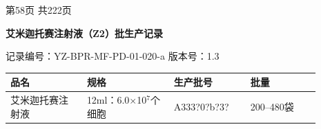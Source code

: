 \documentclass[UTF8,10pt,a4paper,fontset=fandol]{ctexart}
\newcommand{\fieldvalue}[1]{#1}
\newcommand{\handwritten}[1]{#1}
\begin{document}
\vfill
\begin{center}
第58页 共222页
\end{center}

\newpage

\begin{center}
\textbf{艾米迦托赛注射液（Z2）批生产记录}

记录编号：YZ-BPR-MF-PD-01-020-a \hspace{1em} 版本号：1.3
\end{center}

\begin{tabular}{|p{0.22\linewidth}|p{0.25\linewidth}|p{0.22\linewidth}|p{0.20\linewidth}|}
\hline
品名 & 规格 & 生产批号 & 批量 \\ \hline
艾米迦托赛注射液 &
12ml：6.0$\times$10$^{7}$个细胞 &
\fieldvalue{\handwritten{A333?0?b?3?}} &
200--480袋 \\ \hline
\end{tabular}

\vspace{0.5em}
\end{document}
